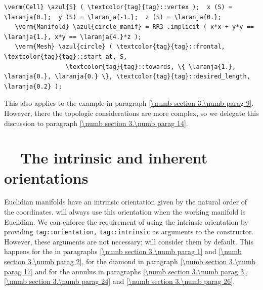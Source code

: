\begin{Verbatim}[commandchars=\\\{\},formatcom=\small\tt,
   baselinestretch=0.94,framesep=2mm                     ]
   \verm{Cell} \azul{S} ( \textcolor{tag}{tag}::vertex );  x (S) = \laranja{0.};  y (S) = \laranja{-1.};  z (S) = \laranja{0.};
   \verm{Manifold} \azul{circle_manif} = RR3 .implicit ( x*x + y*y == \laranja{1.}, x*y == \laranja{4.}*z );
   \verm{Mesh} \azul{circle} ( \textcolor{tag}{tag}::frontal, \textcolor{tag}{tag}::start_at, S,
                 \textcolor{tag}{tag}::towards, \{ \laranja{1.}, \laranja{0.}, \laranja{0.} \}, \textcolor{tag}{tag}::desired_length, \laranja{0.2} );
\end{Verbatim}

This also applies to the example in paragraph \ref{\numb section 3.\numb parag 9}.
However, there the topologic considerations are more complex, so we delegate this
discussion to paragraph \ref{\numb section 3.\numb parag 14}.


\section{~~The intrinsic and inherent orientations}\label{\numb section 3.\numb parag 13}

Euclidian manifolds have an intrinsic orientation given by the natural order of the
coordinates.
{\ManiFEM} will always use this orientation when the working manifold is Euclidian.
We can enforce the requirement of using the intrinsic orientation by providing
{\small\tt\textcolor{tag}{tag}::orientation,} {\small\tt\textcolor{tag}{tag}::intrinsic}
as arguments to the {\small\tt{}} constructor.
However, these arguments are not necessary; {\maniFEM} will consider them by default.
This happens for the {\small\tt{}} in paragraphs \ref{\numb section 3.\numb parag 1} and
\ref{\numb section 3.\numb parag 2}, for the diamond in
paragraph \ref{\numb section 3.\numb parag 17} and for the annulus in paragraphs
\ref{\numb section 3.\numb parag 3}, \ref{\numb section 3.\numb parag 24}
and \ref{\numb section 3.\numb parag 26}.

